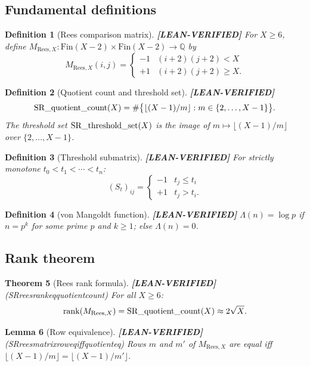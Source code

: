 \documentclass[11pt]{article}
\newtheorem{theorem}{Theorem}[section]
\newtheorem{lemma}[theorem]{Lemma}
\newtheorem{definition}[theorem]{Definition}
\theoremstyle{remark}
\newcommand{\LEANVERIFIED}{\textbf{\color{green!60!black}[LEAN-VERIFIED]}}
\DeclareRobustCommand{\_}{\ifmmode\text{\textunderscore}\else\textunderscore\allowbreak\fi}
\begin{document}
\subsection{Fundamental definitions}

\begin{definition}[Rees comparison matrix] \LEANVERIFIED{}
For $X \geq 6$, define $M_{\mathrm{Rees},X} : \mathrm{Fin}(X-2) \times \mathrm{Fin}(X-2) \to \mathbb{Q}$ by
\[
M_{\mathrm{Rees},X}(i,j) = \begin{cases} -1 & (i+2)(j+2) < X \\ +1 & (i+2)(j+2) \geq X. \end{cases}
\]
\end{definition}

\begin{definition}[Quotient count and threshold set] \LEANVERIFIED{}
\[
\mathrm{SR\_quotient\_count}(X) = \#\bigl\{\lfloor(X-1)/m\rfloor : m \in \{2,\ldots,X-1\}\bigr\}.
\]
The threshold set $\mathrm{SR\_threshold\_set}(X)$ is the image of $m \mapsto \lfloor(X-1)/m\rfloor$
over $\{2,\ldots,X-1\}$.
\end{definition}

\begin{definition}[Threshold submatrix] \LEANVERIFIED{}
For strictly monotone $t_0 < t_1 < \cdots < t_n$:
\[
(S_t)_{ij} = \begin{cases} -1 & t_j \leq t_i \\ +1 & t_j > t_i. \end{cases}
\]
\end{definition}

\begin{definition}[von Mangoldt function] \LEANVERIFIED{}
$\Lambda(n) = \log p$ if $n = p^k$ for some prime $p$ and $k \geq 1$; else $\Lambda(n) = 0$.
\end{definition}

\subsection{Rank theorem}

\begin{theorem}[Rees rank formula] \LEANVERIFIED{} \textnormal{(SR\_rees\_rank\_eq\_quotient\_count)}
For all $X \geq 6$:
\[
\operatorname{rank}(M_{\mathrm{Rees},X}) = \mathrm{SR\_quotient\_count}(X) \approx 2\sqrt{X}.
\]
\end{theorem}

\begin{lemma}[Row equivalence] \LEANVERIFIED{} \textnormal{(SR\_rees\_matrix\_row\_eq\_iff\_quotient\_eq)}
Rows $m$ and $m'$ of $M_{\mathrm{Rees},X}$ are equal iff $\lfloor(X-1)/m\rfloor = \lfloor(X-1)/m'\rfloor$.
\end{lemma}
\end{document}
